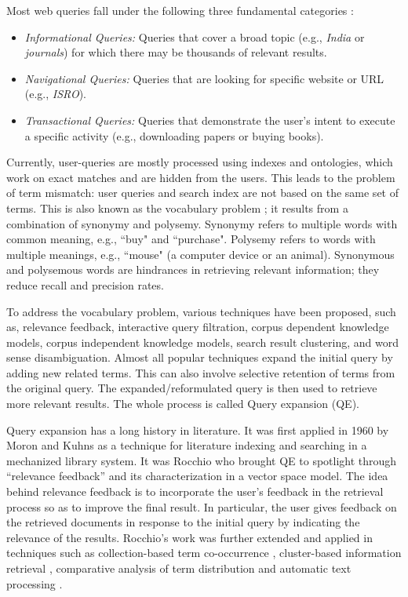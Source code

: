 Most web queries fall under the following three fundamental categories \cite{broder2002taxonomy,kang2003query} :
\begin{itemize}
	\item \emph{Informational Queries:} Queries that cover a broad topic (e.g., \emph{India} or \emph{journals}) for which there may be thousands of relevant results.
	\item \emph{Navigational Queries:} Queries that are looking for specific website or URL (e.g., \emph{ISRO}).  
	\item \emph{Transactional Queries:} Queries that demonstrate the user's intent to execute a specific activity (e.g., downloading papers or buying books).
\end{itemize}

Currently, user-queries are mostly processed using indexes and ontologies, which work on exact matches and are hidden from the users. This leads to the problem of term mismatch: user queries and search index are not based on the same set of terms. This is also known as the vocabulary problem \cite{furnas1987vocabulary}; it results from a combination of synonymy and polysemy. Synonymy refers to multiple words with common meaning, e.g., ``buy" and ``purchase". Polysemy refers to words with multiple meanings, e.g., ``mouse" (a computer device or an animal). Synonymous and polysemous words are hindrances in retrieving relevant information; they reduce recall and precision rates.  

To address the vocabulary problem, various techniques have been proposed, such as,  relevance feedback, interactive query filtration, corpus dependent knowledge models, corpus independent knowledge models, search result clustering, and word sense disambiguation. Almost all popular techniques expand the initial query by adding new related terms. This can also involve selective retention of terms from the original query. The expanded/reformulated query is then used to retrieve more relevant results. The whole process is called Query expansion (QE). 

Query expansion has a long history in literature. It was first applied in 1960 by Moron and Kuhns \cite{maron1960relevance}  as a technique for literature indexing and searching in a mechanized library system. It was Rocchio \cite{rocchio1971relevance} who brought QE to spotlight through ``relevance feedback'' and its characterization in a vector space model. The idea behind relevance feedback is to incorporate the user's feedback in the retrieval process so as to improve the final result. In particular, the user gives feedback on the retrieved documents in response to the initial query by indicating the relevance of the results. Rocchio's work was further extended and applied in techniques such as collection-based term co-occurrence \cite{jones1971automatic,van1977theoretical}, cluster-based information retrieval \cite{jardine1971use,minker1972evaluation}, comparative analysis of term distribution \cite{porter1982implementing,yu1983generalized,van1986non} and automatic text processing \cite{salton1988term,salton1989automatic,salton1991developments}. 

